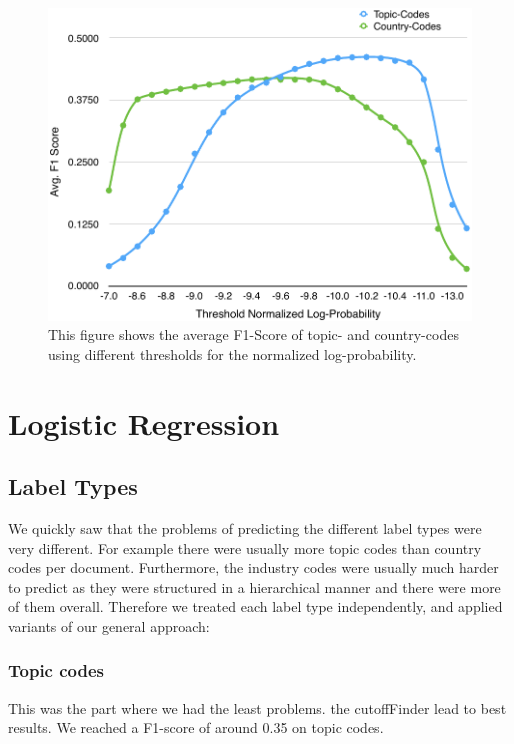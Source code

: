 \documentclass{article}
\begin{document}
\begin{figure}[h!]
    \centering
    \includegraphics[scale=0.6]{graphics/BayesF1ScoreTopicCountry.pdf}
    \caption{This figure shows the average F1-Score of topic- and country-codes using different thresholds for the normalized log-probability.}
    \label{fig_bayesThreshold}
\end{figure}

\section*{Logistic Regression}
\subsection{Label Types}
        We quickly saw that the problems of predicting the different label types were very different. For example there were usually more topic codes than  country codes per document. Furthermore, the industry codes were usually much harder to predict as they were structured in a hierarchical manner and there were more of them overall. Therefore we treated each label type independently, and applied variants of our general approach:
            \subsubsection{ Topic codes}
                This was the part where we had the least problems. the cutoffFinder lead to best results.  We reached a F1-score of around 0.35 on topic codes.
\end{document}
